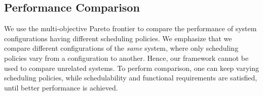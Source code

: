 \subsection{Performance Comparison}
We use the multi-objective Pareto frontier to compare the performance of system configurations having different scheduling policies. We emphasize that we compare different configurations of the \textit{same} system, where only scheduling policies vary from a configuration to another. Hence, our framework cannot be used to compare unrelated systems. To perform comparison, one can keep varying scheduling policies, while schedulability and functional requirements are satisfied, until better performance is achieved.   

 

 



